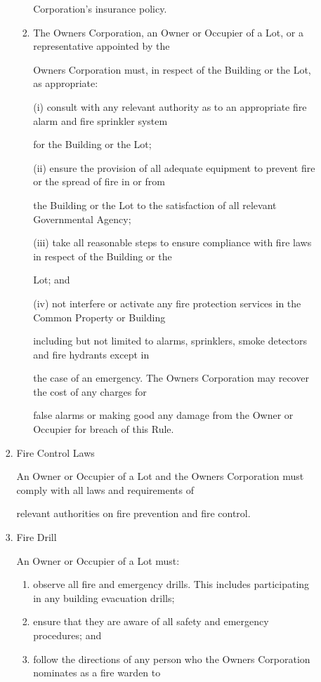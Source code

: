 \documentclass{article}
\begin{document}
\begin{enumerate}[label=\arabic*.]
\begin{enumerate}[label=\arabic{enumi}.\arabic*.]
\begin{enumerate}[label=(\arabic*)]
\begin{enumerate}[label=(\alph*)]
Corporation’s insurance policy. 

\item  The Owners Corporation, an Owner or Occupier of a Lot, or a representative appointed by the 

Owners Corporation must, in respect of the Building or the Lot, as appropriate: 

(i) consult with any relevant authority as to an appropriate fire alarm and fire sprinkler system 

for the Building or the Lot; 

(ii) ensure the provision of all adequate equipment to prevent fire or the spread of fire in or from 

the Building or the Lot to the satisfaction of all relevant Governmental Agency; 

(iii) take all reasonable steps to ensure compliance with fire laws in respect of the Building or the 

Lot; and 

(iv) not interfere or activate any fire protection services in the Common Property or Building 

including but not limited to alarms, sprinklers, smoke detectors and fire hydrants except in 

the case of an emergency. The Owners Corporation may recover the cost of any charges for 

false alarms or making good any damage from the Owner or Occupier for breach of this Rule. 

\end{enumerate}
\item  Fire Control Laws 

An Owner or Occupier of a Lot and the Owners Corporation must comply with all laws and requirements of 

relevant authorities on fire prevention and fire control. 

\item  Fire Drill 

An Owner or Occupier of a Lot must: 

\begin{enumerate}[label=(\alph*)]
\item  observe all fire and emergency drills. This includes participating in any building evacuation drills; 

\item  ensure that they are aware of all safety and emergency procedures; and 

\item  follow the directions of any person who the Owners Corporation nominates as a fire warden to 


\end{enumerate}
\end{enumerate}
\end{enumerate}
\end{enumerate}
\end{document}
